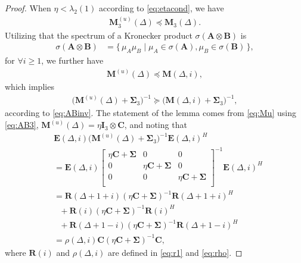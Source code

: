 \documentclass[conference, a4paper, 10pt]{IEEEtran}
\newcommand{\mx}[1]{\mathbf{#1}}
\newcommand{\bs}[1]{\boldsymbol{#1}}
\begin{document}
\begin{proof}
When $\eta<\lambda_2(1)$ according to \eqref{eq:etacond}, we have
\begin{align}
\label{lem3:13}
\mx{M}_3^{(u)}(\Delta) \preceq \mx{M}_3(\Delta).
\end{align}
Utilizing that
the spectrum of a Kronecker product $\sigma(\mx{A}\otimes \mx{B})$ is \cite{Horn:91}
\begin{align}
    \sigma(\mx{A}\otimes\mx{B}) &=
    \{\,
    \mu_A\mu_B \mid \mu_A \in \sigma(\mx{A}), \mu_B \in
    \sigma(\mx{B}) \,\},
\end{align}
for $\forall i\geq 1$, we further have
\begin{align}
\label{lem3:1}
\mx{M}^{(u)}(\Delta) \preceq \mx{M}(\Delta,i),
\end{align}
which implies
\begin{align}\label{eq:Mu}
\big(\mx{M}^{(u)}(\Delta)+\mx{\Sigma}_3\big)^{-1} \succeq  \big(\mx{M}(\Delta,i)+\mx{\Sigma}_3\big)^{-1},
\end{align}
according to \eqref{eq:ABinv}.
The statement of the lemma %
comes from \eqref{eq:Mu} using \eqref{eq:AB3},
$\mx{M}^{(u)}(\Delta)=\eta \mx{I}_{3} \otimes \mx{C}$,
and noting that
\begin{align}
\nonumber
&\mx{E}(\Delta, i) \big(\mx{M}^{(u)}(\Delta)+\mx{\Sigma}_3\big)^{-1} \mx{E}(\Delta, i)^H
\\\nonumber &= \mx{E}(\Delta, i) \begin{bmatrix}
\eta \mx{C} + \bs{\Sigma} & 0 & 0  \\
0 & \eta \mx{C} + \bs{\Sigma} & 0  \\
0 &  0 & \eta \mx{C} + \bs{\Sigma} \\
\end{bmatrix}^{-1} \mx{E}(\Delta, i)^H
\\\nonumber &=
\mx{R}(\Delta \!+\! 1 \!+\! i)
(\eta \mx{C} + \bs{\Sigma})^{-1}
\mx{R}(\Delta \!+\! 1 \!+\! i)^H
\\\nonumber &~~~+
\mx{R}(i)(\eta \mx{C} + \bs{\Sigma})^{-1}
\mx{R}(i)^H
\\\nonumber &~~~+
\mx{R}(\Delta \!+\! 1 \!-\! i)
(\eta \mx{C} + \bs{\Sigma})^{-1}
\mx{R}(\Delta \!+\! 1 \!-\! i)^H
\\&= \rho(\Delta, i) \mx{C} \left( \eta \mx{C} + \bs{\Sigma} \right)^{-1} \mx{C},
\end{align}
where $\mx{R}(i)$ and $\rho(\Delta, i)$ are defined in \eqref{eq:r1} and \eqref{eq:rho}.
\end{proof}
\end{document}
